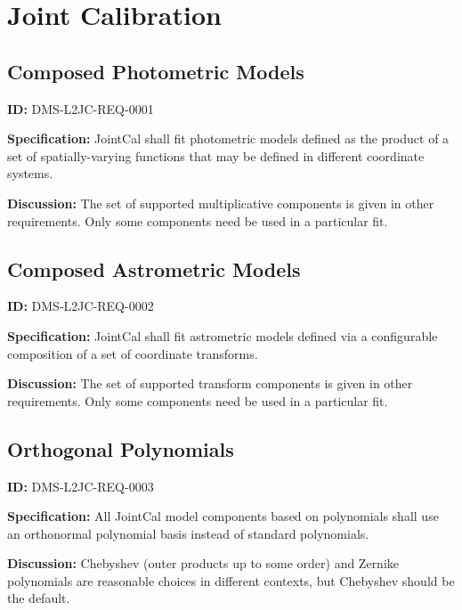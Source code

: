 \documentclass[SE,toc,lsstdraft]{lsstdoc}
\date{2017-09-11}
\begin{document}
\maketitle

\section{Joint Calibration}

\subsection{Composed Photometric Models}

\label{DMS-L2JC-REQ-0001}
\textbf{ID:} DMS-L2JC-REQ-0001

\textbf{Specification:}
JointCal shall fit photometric models defined as the product of a set of spatially-varying functions that may be defined in different coordinate systems.

\textbf{Discussion:}
The set of supported multiplicative components is given in other requirements.  Only some components need be used in a particular fit.

\subsection{Composed Astrometric Models}

\label{DMS-L2JC-REQ-0002}
\textbf{ID:} DMS-L2JC-REQ-0002

\textbf{Specification:}
JointCal shall fit astrometric models defined via a configurable composition of a set of coordinate transforms.

\textbf{Discussion:}
The set of supported transform components is given in other requirements.  Only some components need be used in a particular fit.

\subsection{Orthogonal Polynomials}

\label{DMS-L2JC-REQ-0003}
\textbf{ID:} DMS-L2JC-REQ-0003

\textbf{Specification:}
All JointCal model components based on polynomials shall use an orthonormal polynomial basis instead of standard polynomials.

\textbf{Discussion:}
Chebyshev (outer products up to some order) and Zernike polynomials are reasonable choices in different contexts, but Chebyshev should be the default.
\end{document}

